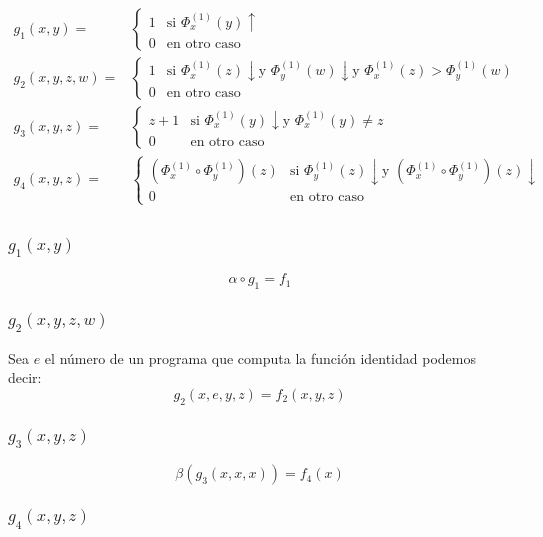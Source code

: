\documentclass[fleqn, 11pt]{article}
\newcommand{\indef}{\uparrow}
\newcommand{\ddef}{\downarrow}
\begin{document}
\begin{align*}
	g_1(x, y) =&
	\begin{cases}
		1 & \text{si } \Phi^{(1)}_x(y) \indef \\
		0 & \text{en otro caso}
	\end{cases} \\
	g_2(x, y, z, w) =&
	\begin{cases}
		1 & \text{si } \Phi^{(1)}_x(z) \ddef \text{y }
		    \Phi^{(1)}_y(w) \ddef \text{y }
		    \Phi^{(1)}_x(z) > \Phi^{(1)}_y(w) \\
		0 & \text{en otro caso}
	\end{cases} \\
	g_3(x, y, z) =&
	\begin{cases}
		z + 1 & \text{si } \Phi^{(1)}_x(y) \ddef \text{y }
		        \Phi^{(1)}_x(y) \neq z \\
		0     & \text{en otro caso}
	\end{cases} \\
	g_4(x, y, z) =&
	\begin{cases}
		(\Phi^{(1)}_x \circ \Phi^{(1)}_y)(z)
		  & \text{si } \Phi^{(1)}_y(z) \ddef \text{y }
		    (\Phi^{(1)}_x \circ \Phi^{(1)}_y)(z) \ddef \\
		0 & \text{en otro caso}
	\end{cases} \\
\end{align*}

\subsubsection{$g_1(x, y)$}

\[
	\alpha \circ g_1 = f_1
\]

\subsubsection{$g_2(x, y, z, w)$}

Sea $e$ el número de un programa que computa la función identidad podemos decir:
\[
	g_2(x, e, y, z) = f_2(x, y, z)
\]

\subsubsection{$g_3(x, y, z)$}

\[
	\beta(g_3(x, x, x)) = f_4(x)
\]

\subsubsection{$g_4(x, y, z)$}
\end{document}
